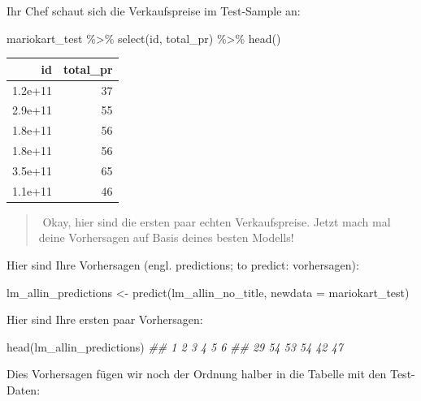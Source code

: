 \documentclass[
  letterpaper,
  oneside,
  open=any]{scrbook}
\newenvironment{Shaded}{\begin{snugshade}}{\end{snugshade}}
\newcommand{\AttributeTok}[1]{\textcolor[rgb]{0.40,0.45,0.13}{#1}}
\newcommand{\DocumentationTok}[1]{\textcolor[rgb]{0.37,0.37,0.37}{\textit{#1}}}
\newcommand{\FunctionTok}[1]{\textcolor[rgb]{0.28,0.35,0.67}{#1}}
\newcommand{\NormalTok}[1]{\textcolor[rgb]{0.00,0.23,0.31}{#1}}
\newcommand{\OtherTok}[1]{\textcolor[rgb]{0.00,0.23,0.31}{#1}}
\newcommand{\SpecialCharTok}[1]{\textcolor[rgb]{0.37,0.37,0.37}{#1}}
\theoremstyle{definition}
\theoremstyle{definition}
\theoremstyle{definition}
\theoremstyle{remark}
\begin{document}
Ihr Chef schaut sich die Verkaufspreise im Test-Sample an:

\begin{Shaded}
\begin{Highlighting}[]
\NormalTok{mariokart\_test }\SpecialCharTok{\%\textgreater{}\%} 
  \FunctionTok{select}\NormalTok{(id, total\_pr) }\SpecialCharTok{\%\textgreater{}\%} 
  \FunctionTok{head}\NormalTok{()}
\end{Highlighting}
\end{Shaded}

\begin{longtable}[]{@{}rr@{}}
\toprule\noalign{}
id & total\_pr \\
\midrule\noalign{}
\endhead
\bottomrule\noalign{}
\endlastfoot
1.2e+11 & 37 \\
2.9e+11 & 55 \\
1.8e+11 & 56 \\
1.8e+11 & 56 \\
3.5e+11 & 65 \\
1.1e+11 & 46 \\
\end{longtable}

\begin{quote}
{}️ Okay, hier sind die ersten paar echten Verkaufspreise.
Jetzt mach mal deine Vorhersagen auf Basis deines besten Modells!
\end{quote}

Hier sind Ihre Vorhersagen (engl. predictions; to predict: vorhersagen):

\begin{Shaded}
\begin{Highlighting}[]
\NormalTok{lm\_allin\_predictions }\OtherTok{\textless{}{-}} \FunctionTok{predict}\NormalTok{(lm\_allin\_no\_title, }\AttributeTok{newdata =}\NormalTok{ mariokart\_test)}
\end{Highlighting}
\end{Shaded}

Hier sind Ihre ersten paar Vorhersagen:

\begin{Shaded}
\begin{Highlighting}[]
\FunctionTok{head}\NormalTok{(lm\_allin\_predictions)}
\DocumentationTok{\#\#  1  2  3  4  5  6 }
\DocumentationTok{\#\# 29 54 53 54 42 47}
\end{Highlighting}
\end{Shaded}

Dies Vorhersagen fügen wir noch der Ordnung halber in die Tabelle mit
den Test-Daten:
\end{document}
